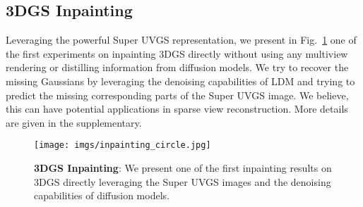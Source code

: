 \subsection{3DGS Inpainting}
Leveraging the powerful Super UVGS representation, we present in Fig.~\ref{fig:inpaint} one of the first experiments on inpainting 3DGS directly without using any multiview rendering or distilling information from diffusion models. 
We try to recover the missing Gaussians by leveraging the denoising capabilities of LDM and trying to predict the missing corresponding parts of the Super UVGS image. We believe, this can have potential applications in sparse view reconstruction.
More details are given in the supplementary.

\begin{figure}[t]
\centering
\texttt{[image: imgs/inpainting\_circle.jpg]} 
\vspace{-0.5cm}
\caption{\textbf{3DGS Inpainting}: We present one of the first inpainting results on 3DGS directly leveraging the Super UVGS images and the denoising capabilities of diffusion models.
}
\label{fig:inpaint}
\vspace{-0.4cm}
\end{figure}



